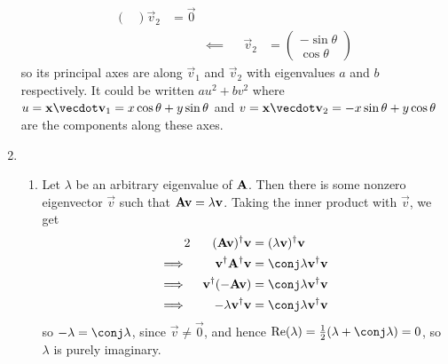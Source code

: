 \documentclass[fleqn,a4paper,11pt]{article}
\begin{document}
\begin{enumerate}[label=\textbf{\arabic*.}]
\begin{alignat*}
\begin{pmatrix}
    \end{pmatrix}
    \vec v_2 &= \vec 0 \\
    &&\impliedby{}&&
    \vec v_2 &= \begin{pmatrix} -\sin \theta \\ \cos \theta \end{pmatrix}
   \end{alignat*}
   so its principal axes are along \(\vec v_1\) and \(\vec v_2\) with
   eigenvalues \(a\) and \(b\) respectively. It could be written
   \(au^2 + bv^2\) where
   \(u = \vec x \vecdot \vec v_1 = x \cos \theta + y \sin \theta\) and
   \(v = \vec x \vecdot \vec v_2 = -x \sin \theta + y \cos \theta\) are the
   components along these axes.
  \item
   \begin{enumerate}[label=(\roman*)]
    \item
     Let \(\lambda\) be an arbitrary eigenvalue of \(\mathbf{A}\). Then there is
     some nonzero eigenvector \(\vec v\) such that
     \(\mathbf{A} \mathrm{\mathbf{v}} = \lambda \mathrm{\mathbf{v}}\). Taking the inner product with
     \(\vec v\), we get
     \begin{alignat*}2
      && \herm{(\mat A \vec v)} \vec v
      &= \herm{(\lambda \vec v)} \vec v \\
      \implies{}&&
      \herm{\vec v} \herm{\mat A} \vec v
      &= \conj \lambda \herm{\vec v} \vec v \\
      \implies{}&&
      \herm{\vec v} (-\mat A \vec v)
      &= \conj \lambda \herm{\vec v} \vec v \\
      \implies{}&&
      -\lambda \herm{\vec v} \vec v
      &= \conj \lambda \herm{\vec v} \vec v
     \end{alignat*}
     so \(-\lambda = \conj \lambda\), since \(\vec v \ne \vec 0\), and hence
     \(\Re(\lambda) = \frac 12(\lambda + \conj \lambda) = 0\), so \(\lambda\)
     is purely imaginary.


\end{enumerate}
\end{enumerate}
\end{document}
